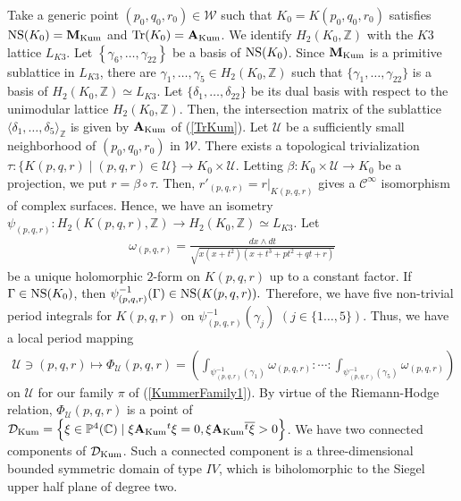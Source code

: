 \documentclass[10pt]{article}
\begin{document}
Take a generic point $(p_0,q_0,r_0)\in \mathcal{W}$ such that
$K_0= K(p_0,q_0,r_0) $ satisfies ${\rm NS}(K_0)={\bf M}_{\rm Kum}$ and ${\rm Tr}(K_0)={\bf A}_{\rm Kum}$.
We identify $H_2(K_0,\mathbb{Z})$ with the $K3$ lattice $L_{K3}$.
Let $\left\{ \gamma_6,\ldots, \gamma_{22} \right\}$ be a basis of ${\rm NS}(K_0)$.
Since ${\bf M_{\rm Kum}}$ is a primitive sublattice in $L_{K3}$,
there are $\gamma_1,\ldots,\gamma_5 \in H_2(K_0,\mathbb{Z}) $ such that $\{\gamma_1,\ldots,\gamma_{22}\}$ is a basis of $H_2(K_0,\mathbb{Z}) \simeq L_{K3}$.
Let $\{\delta_1,\ldots,\delta_{22}\}$ be its dual basis with respect to the unimodular lattice $H_2(K_0,\mathbb{Z})$. 
Then, the intersection matrix of the  sublattice $\langle \delta_1,\ldots,\delta_5 \rangle_\mathbb{Z}$ is given by ${\bf A_{\rm Kum}}$ of (\ref{TrKum}).
Let $\mathcal{U}$ be a sufficiently small neighborhood of $(p_0,q_0,r_0)$ in $\mathcal{W}$.
There exists a topological trivialization $\tau:\{K(p,q,r)\mid (p,q,r) \in \mathcal{U}\} \rightarrow K_0\times \mathcal{U}$. 
Letting $\beta : K_0 \times \mathcal{U} \rightarrow K_0$ be a projection, we put $r = \beta \circ \tau.$
Then, $r'_{(p,q,r)} = r |_{K(p,q,r)}$ gives a $\mathcal{C}^\infty$ isomorphism of complex surfaces.
Hence, we have an isometry $\psi_{(p,q,r)}: H_2(K(p,q,r),\mathbb{Z}) \rightarrow H_2(K_0,\mathbb{Z})\simeq L_{K3}$.
Let 
\begin{align}\label{omega}
\omega_{(p,q,r)}=\frac{dx \wedge dt}{\sqrt{x (x+t^2) (x+t^3 +p t^2 + q t +r)}}
\end{align}
be a unique holomorphic $2$-form on $K(p,q,r)$ up to a constant factor.
If $\Gamma \in {\rm NS}(K_0)$, then $\psi_{(p,q,r)}^{-1}(\Gamma) \in {\rm NS}(K(p,q,r)).$ 
Therefore, we have five non-trivial period integrals for $K(p,q,r)$ on $\psi_{(p,q,r)}^{-1} (\gamma_j)$ $(j\in \{1\ldots,5\})$.
Thus, we have a local period mapping
\begin{align}\label{PeriodPhi}
\mathcal{U} \ni (p,q,r) \mapsto \Phi_\mathcal{U} (p,q,r)=\left( \int_{\psi_{(p,q,r)}^{-1} (\gamma_1)} \omega_{(p,q,r)} : \cdots :   \int_{\psi_{(p,q,r)}^{-1} (\gamma_5)} \omega_{(p,q,r)}\right)
\end{align}
on $\mathcal{U}$ for our family $\pi$ of (\ref{KummerFamily1}).
By virtue of the Riemann-Hodge relation,
$ \Phi_\mathcal{U} (p,q,r)$
is a point of 
$\mathcal{D}_{\rm Kum} = \left\{ \xi\in\mathbb{P}^4 (\mathbb{C}) \mid \xi {\bf A_{\rm Kum}} {}^t \xi =0,  \xi {\bf A_{\rm Kum}} \overline{{}^t \xi} >0 \right\}$.
We have two connected components of $\mathcal{D}_{\rm Kum}$.
Such a connected component is a three-dimensional bounded symmetric domain of type $IV$,
which is biholomorphic to the Siegel upper half plane of degree two.
\end{document}
